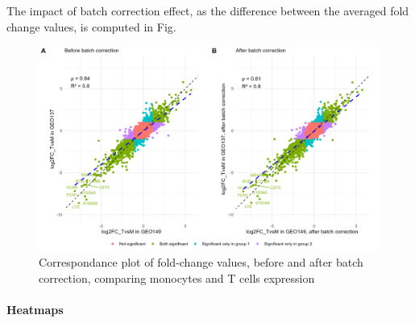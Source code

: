 \begin{Shaded}
\begin{Highlighting}[]
\SpecialCharTok{::}\OtherTok{\textless{}{-}}\SpecialCharTok{::}\SpecialCharTok{\%\textgreater{}\%}
\SpecialCharTok{::}\NormalTok{(} \NormalTok{)}
\OtherTok{\textless{}{-}}\SpecialCharTok{::}\NormalTok{(}
   \NormalTok{)}
\end{Highlighting}
\end{Shaded}

The impact of batch correction effect, as the difference between the averaged fold change values, is computed in Fig. 

\begin{figure}

{\centering \includegraphics[width=0.9\linewidth]{./figures/batch_effect_concord_plot} 

}

\caption{Correspondance plot of fold-change values, before and after batch correction, comparing monocytes and T cells expression}
\label{fig:concord-plot2}
\end{figure}


\paragraph{Heatmaps}
\label{heatmaps}

